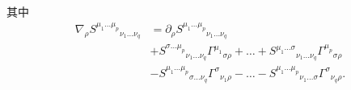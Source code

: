 \begin{definition}
\begin{equation}
			\end{equation}
			其中
			\begin{equation}
				\begin{split}
					\nabla_{\rho}{S^{\mu_1\dots\mu_p}}_{\nu_1\dots\nu_q}&=\partial_\rho{S^{\mu_1\dots\mu_p}}_{\nu_1\dots\nu_q}\\
					&+{S^{\sigma\dots\mu_p}}_{\nu_1\dots\nu_q}{\varGamma^{\mu_1}}_{\sigma\rho}+\dots+{S^{\mu_1\dots\sigma}}_{\nu_1\dots\nu_q}{\varGamma^{\mu_p}}_{\sigma\rho}\\
					&-{S^{\mu_1\dots\mu_p}}_{\sigma\dots\nu_q}{\varGamma^{\sigma}}_{\nu_1\rho}-\dots-{S^{\mu_1\dots\mu_p}}_{\nu_1\dots\sigma}{\varGamma^{\sigma}}_{\nu_q\rho}.
				\end{split}		
			\end{equation}
		\end{definition}
		
	
	\newpage